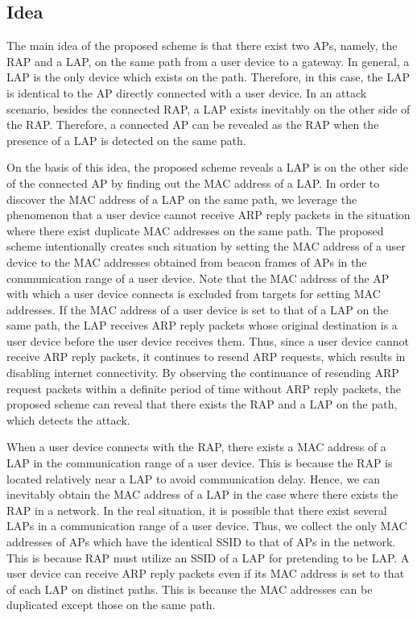 \documentclass[conference]{IEEEtran}
\begin{document}
\subsection{Idea}
The main idea of the proposed scheme is that there exist two APs, namely, the RAP and a LAP, on the same path from a user device to a gateway.
In general, a LAP is the only device which exists on the path.
Therefore, in this case, the LAP is identical to the AP directly connected with a user device.
In an attack scenario, besides the connected RAP, a LAP exists inevitably on the other side of the RAP.
Therefore, a connected AP can be revealed as the RAP when the presence of a LAP is detected on the same path.

On the basis of this idea, the proposed scheme reveals a LAP is on the other side of the connected AP by finding out the MAC address of a LAP.
In order to discover the MAC address of a LAP on the same path, we leverage the phenomenon that a user device cannot receive ARP reply packets in the situation where there exist duplicate MAC addresses on the same path.
The proposed scheme intentionally creates such situation by setting the MAC address of a user device to the MAC addresses obtained from beacon frames of APs in the communication range of a user device.
Note that the MAC address of the AP with which a user device connects is excluded from targets for setting MAC addresses.
If the MAC address of a user device is set to that of a LAP on the same path, the LAP receives ARP reply packets whose original destination is a user device before the user device receives them.
Thus, since a user device cannot receive ARP reply packets, it continues to resend ARP requests, which results in disabling internet connectivity.
By observing the continuance of resending ARP request packets within a definite period of time without ARP reply packets, the proposed scheme can reveal that there exists the RAP and a LAP on the path, which detects the attack. %

When a user device connects with the RAP, there exists a MAC address of a LAP in the communication range of a user device.
This is because the RAP is located relatively near a LAP to avoid communication delay.
Hence, we can inevitably obtain the MAC address of a LAP in the case where there exists the RAP in a network.
In the real situation, it is possible that there exist several LAPs in a communication range of a user device.
Thus, we collect the only MAC addresses of APs which have the identical SSID to that of APs in the network.
This is because RAP must utilize an SSID of a LAP for pretending to be LAP.
A user device can receive ARP reply packets even if its MAC address is set to that of each LAP on distinct paths.
This is because the MAC addresses can be duplicated except those on the same path.
\end{document}
